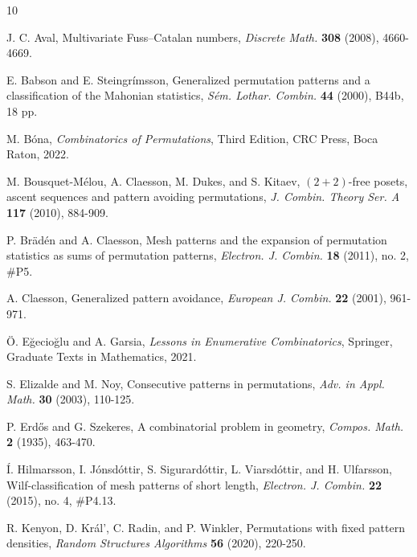 \documentclass[11pt]{article}
\theoremstyle{definition}
\numberwithin{equation}{section}
\begin{document}
\begin{thebibliography}{10}


 J. C. Aval, Multivariate Fuss–Catalan numbers, \textit{Discrete Math.} \textbf{308} (2008), 4660-4669.

 E. Babson and E. Steingrímsson, Generalized permutation patterns and a classification
of the Mahonian statistics, \textit{Sém. Lothar. Combin.} \textbf{44} (2000), B44b, 18 pp.

 M. B\'{o}na, \textit{Combinatorics of Permutations}, Third Edition, CRC Press, Boca Raton, 2022.

 M. Bousquet-M\'{e}lou, A. Claesson, M. Dukes, and S. Kitaev, $(2+2)$-free posets, ascent sequences and pattern avoiding permutations, \textit{J. Combin. Theory Ser. A} \textbf{117} (2010), 884-909.

 P. Br\"{a}d\'{e}n and A. Claesson, Mesh patterns and the expansion of permutation statistics as sums of permutation patterns, \textit{Electron. J. Combin.} \textbf{18} (2011), no. 2, \#P5.

 A. Claesson, Generalized pattern avoidance, \textit{European J. Combin.} \textbf{22} (2001), 961-971.

 \"{O}. E\u{g}ecio\u{g}lu and A. Garsia,
\textit{Lessons in Enumerative Combinatorics}, Springer, Graduate Texts in Mathematics, 2021.

 S. Elizalde and M. Noy, Consecutive patterns in permutations, \textit{Adv. in Appl. Math.} \textbf{30} (2003), 110-125.

 P. Erd\H{o}s and G. Szekeres, A combinatorial problem in geometry, \textit{Compos. Math.} \textbf{2} (1935), 463-470.

 \'{I}. Hilmarsson, I. J\'{o}nsd\'{o}ttir, S. Sigur\textipa{\dh}ard\'{o}ttir, L. Vi\textipa{\dh}arsd\'{o}ttir, and H. Ulfarsson, Wilf-classification of mesh patterns of short length, \textit{Electron. J. Combin.} \textbf{22} (2015), no. 4, \#P4.13.

 R. Kenyon, D. Kr\'{a}l', C. Radin, and P. Winkler, Permutations with fixed pattern densities, \textit{Random Structures Algorithms} \textbf{56} (2020), 220-250.


\end{thebibliography}
\end{document}
